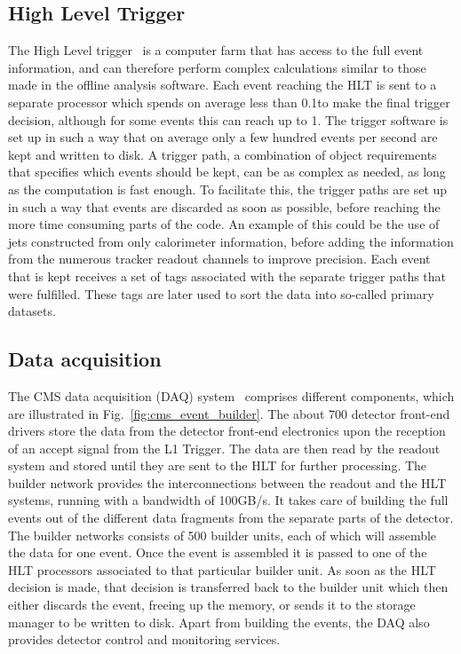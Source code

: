 \subsection{High Level Trigger \label{sec:cms_hlt}}

The High Level trigger~\cite{Adam:2005zf} is a computer farm that has access to the full event
information, and can therefore perform complex calculations similar to those made in the offline
analysis software. 
Each event reaching the HLT is sent to a separate processor which spends on average less than
0.1\second to make the final trigger decision, although for some events this can reach up to
1\second. 
The trigger software is set up in such a way that on average only a few hundred events per second
are kept and written to disk. 
A trigger path, a combination of object requirements that specifies which events should
be kept, can be as complex as needed, as long as the computation is fast enough. 
To facilitate this, the trigger paths are set up in such a way that events are discarded as soon as
possible, before reaching the more time consuming parts of the code. 
An example of this could be the use of jets constructed from only calorimeter information, before
adding the information from the numerous tracker readout channels to improve precision. 
Each event that is kept receives a set of tags associated with the separate trigger paths that were
fulfilled. These tags are later used to sort the data into so-called primary datasets. 



\subsection{Data acquisition \label{sec:cms_daq}}

The CMS data acquisition (DAQ) system~\cite{Cittolin:578006} comprises different components, which
are illustrated in Fig.~\ref{fig:cms_event_builder}. 
The about 700 detector front-end drivers store the data from the detector front-end electronics upon
the reception of an accept signal from the L1 Trigger. The data are then read by the readout system
and stored until they are sent to the HLT for further processing. 
The builder network provides the interconnections between the readout and the HLT systems, running
with a bandwidth of 100\unit{GB/s}. It takes care of building the full events out of the different
data fragments from the separate parts of the detector. The builder networks consists of 500 builder
units, each of which will assemble the data for one event. 
Once the event is assembled it is passed to one of the HLT processors associated to that particular
builder unit. As soon as the HLT decision is made, that decision is transferred back to the builder
unit which then either discards the event, freeing up the memory, or sends it to the storage
manager to be written to disk.
Apart from building the events, the DAQ also provides detector control and monitoring services.

